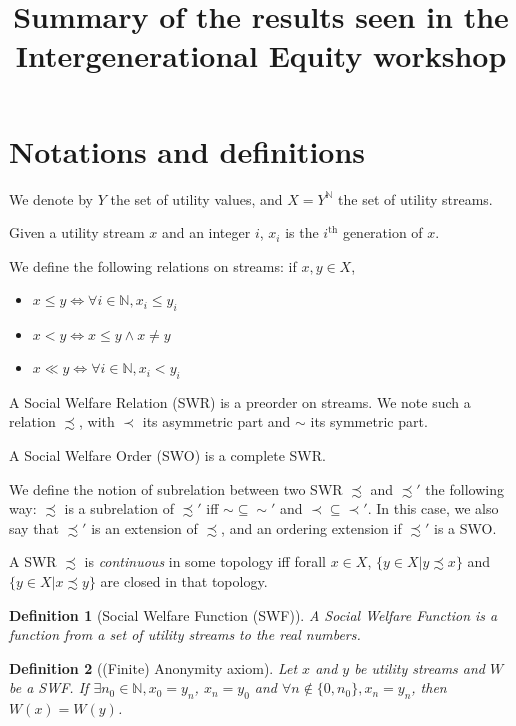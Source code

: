 \documentclass{article}
\title{Summary of the results seen in the Intergenerational Equity workshop}
\author{}
\date{}
\newtheorem{definition}{Definition}
\begin{document}
\maketitle

\section{Notations and definitions}

We denote by $Y$ the set of utility values, and $X=Y^{\mathbb{N}}$ the set of
utility streams.\par
Given a utility stream $x$ and an integer $i$, $x_i$ is the $i^\text{th}$
generation of $x$.\par
We define the following relations on streams: if $x,y\in X$,
\begin{itemize}
    \item $x \leq y \Leftrightarrow \forall i \in \mathbb{N},
        x_i\leq y_i$
    \item $x < y \Leftrightarrow x \leq y \land x \neq y$
    \item $x \ll y \Leftrightarrow \forall i \in \mathbb{N},
        x_i < y_i$
\end{itemize}\par
A Social Welfare Relation (SWR) is a preorder on streams. We note such a relation
$\precsim$, with $\prec$ its asymmetric part and $\sim$ its symmetric part.\par
A Social Welfare Order (SWO) is a complete SWR.\par
We define the notion of subrelation between two SWR $\precsim$ and $\precsim'$
the following way: $\precsim$ is a subrelation of $\precsim'$ iff 
$\sim\subseteq\sim'$ and $\prec\subseteq\prec'$. In this case, we also say that
$\precsim'$ is an extension of $\precsim$, and an ordering extension if
$\precsim'$ is a SWO.\par
A SWR $\precsim$ is \emph{continuous} in some topology iff forall $x\in X$,
$\{y\in X|y\precsim x\}$ and $\{y\in X|x\precsim y\}$ are closed in that
topology.


\begin{definition}[Social Welfare Function (SWF)]
  A Social Welfare Function is a function from a set of utility streams to the real numbers.
\end{definition}

\begin{definition}[(Finite) Anonymity axiom]
  Let $x$ and $y$ be utility streams and $W$ be a SWF.
  If $\exists n_0 \in\mathbb N,x_0=y_n$, $x_n=y_0$ and $\forall n\notin\{0,n_0\}, x_n=y_n$, then $W(x)=W(y)$.
\end{definition}
\end{document}

